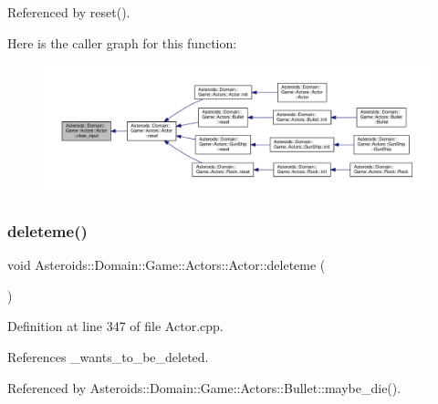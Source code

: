 Referenced by reset().

Here is the caller graph for this function\+:\nopagebreak
\begin{figure}[H]
\begin{center}
\leavevmode
\includegraphics[width=350pt]{classAsteroids_1_1Domain_1_1Game_1_1Actors_1_1Actor_a3678c27cfb63d8b4eb9b0aa64e352ee1_icgraph}
\end{center}
\end{figure}
\mbox{\label{classAsteroids_1_1Domain_1_1Game_1_1Actors_1_1Actor_afb9985ff7dea1fe2d21b365a7aec8a45}} 
\subsubsection{\texorpdfstring{deleteme()}{deleteme()}}
{\footnotesize\ttfamily void Asteroids\+::\+Domain\+::\+Game\+::\+Actors\+::\+Actor\+::deleteme (\begin{DoxyParamCaption}{ }\end{DoxyParamCaption})\hspace{0.3cm}{\ttfamily [protected]}}



Definition at line 347 of file Actor.\+cpp.



References \+\_\+wants\+\_\+to\+\_\+be\+\_\+deleted.



Referenced by Asteroids\+::\+Domain\+::\+Game\+::\+Actors\+::\+Bullet\+::maybe\+\_\+die().

